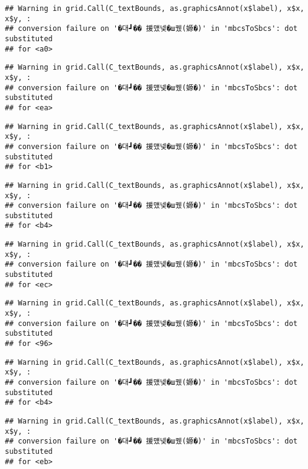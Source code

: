 \documentclass[
]{article}
\begin{document}
\begin{verbatim}
## Warning in grid.Call(C_textBounds, as.graphicsAnnot(x$label), x$x, x$y, :
## conversion failure on '�대┛�� 援먰넻�ш퀬(嫄�)' in 'mbcsToSbcs': dot substituted
## for <a0>
\end{verbatim}

\begin{verbatim}
## Warning in grid.Call(C_textBounds, as.graphicsAnnot(x$label), x$x, x$y, :
## conversion failure on '�대┛�� 援먰넻�ш퀬(嫄�)' in 'mbcsToSbcs': dot substituted
## for <ea>
\end{verbatim}

\begin{verbatim}
## Warning in grid.Call(C_textBounds, as.graphicsAnnot(x$label), x$x, x$y, :
## conversion failure on '�대┛�� 援먰넻�ш퀬(嫄�)' in 'mbcsToSbcs': dot substituted
## for <b1>
\end{verbatim}

\begin{verbatim}
## Warning in grid.Call(C_textBounds, as.graphicsAnnot(x$label), x$x, x$y, :
## conversion failure on '�대┛�� 援먰넻�ш퀬(嫄�)' in 'mbcsToSbcs': dot substituted
## for <b4>
\end{verbatim}

\begin{verbatim}
## Warning in grid.Call(C_textBounds, as.graphicsAnnot(x$label), x$x, x$y, :
## conversion failure on '�대┛�� 援먰넻�ш퀬(嫄�)' in 'mbcsToSbcs': dot substituted
## for <ec>
\end{verbatim}

\begin{verbatim}
## Warning in grid.Call(C_textBounds, as.graphicsAnnot(x$label), x$x, x$y, :
## conversion failure on '�대┛�� 援먰넻�ш퀬(嫄�)' in 'mbcsToSbcs': dot substituted
## for <96>
\end{verbatim}

\begin{verbatim}
## Warning in grid.Call(C_textBounds, as.graphicsAnnot(x$label), x$x, x$y, :
## conversion failure on '�대┛�� 援먰넻�ш퀬(嫄�)' in 'mbcsToSbcs': dot substituted
## for <b4>
\end{verbatim}

\begin{verbatim}
## Warning in grid.Call(C_textBounds, as.graphicsAnnot(x$label), x$x, x$y, :
## conversion failure on '�대┛�� 援먰넻�ш퀬(嫄�)' in 'mbcsToSbcs': dot substituted
## for <eb>
\end{verbatim}
\end{document}
